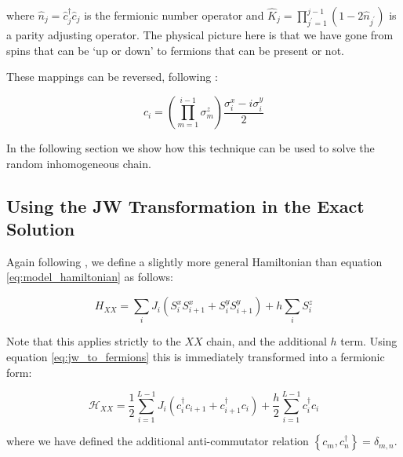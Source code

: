 where $\hat{n}_j=\hat{c}_j^{\dagger} \hat{c}_j$ is the fermionic number operator and $\hat{K}_j=\prod_{j^{\prime}=1}^{j-1}\left(1-2 \hat{n}_{j^{\prime}}\right)$ is a parity adjusting operator. The physical picture here is that we have gone from spins that can be `up or down' to fermions that can be present or not. 


These mappings can be reversed, following \cite{paola2016}:

\begin{equation}\label{eq:jw_to_fermions}
c_i=\left(\prod_{m=1}^{i-1} \sigma_m^z\right) \frac{\sigma_i^x-i \sigma_i^y}{2}
\end{equation}

In the following section we show how this technique can be used to solve the random inhomogeneous chain.

\subsection{Using the JW Transformation in the Exact Solution}\label{subsec:exact_sol_jw}

Again following \cite{paola2016}, we define a slightly more general Hamiltonian than equation \ref{eq:model_hamiltonian} as follows: 

\begin{equation}
H_{X X} =\sum_{i} J_i\left(S_i^x S_{i+1}^x+S_i^y S_{i+1}^y\right)+h \sum_{i} S_i^z
\end{equation}

Note that this applies strictly to the $XX$ chain, and the additional $h$ term. Using equation \ref{eq:jw_to_fermions} this is immediately transformed into a fermionic form: 

\begin{equation}
\mathcal{H}_{X X}=\frac{1}{2} \sum_{i=1}^{L-1} J_i\left(c_i^{\dagger} c_{i+1}+c_{i+1}^{\dagger} c_i\right)+\frac{h}{2} \sum_{i=1}^{L-1} c_i^{\dagger} c_i
\end{equation}

where we have defined the additional anti-commutator relation $\left\{c_m, c_n^{\dagger}\right\}=\delta_{m, n}$. 

